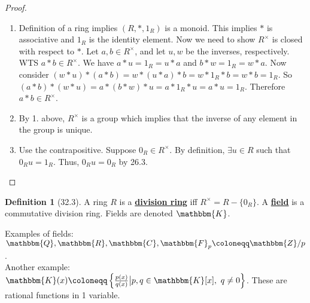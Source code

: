 \documentclass{article}
\newcommand{\Z}{\mathbbm{Z}}
\newcommand{\Q}{\mathbbm{Q}}
\newcommand{\R}{\mathbbm{R}}
\newcommand{\C}{\mathbbm{C}}
\newcommand{\coleq}{\coloneqq}
\newcommand{\define}[1]{\textbf{\underline{#1}}}
\theoremstyle{definition}
\newtheorem*{defn}{Definition}
\theoremstyle{remark}
\newcommand{\K}{\mathbbm{K}}
\begin{document}
{{            \begin{proof}
                \begin{enumerate}
                    \item Definition of a ring implies $(R,*,1_R)$ is a monoid. This implies $*$ is associative and $1_R$ is the identity element. Now we need to show $R^\times$ is closed with respect to $*$. Let $a,b\in R^\times$, and let $u,w$ be the inverses, respectively. WTS $a*b \in R^\times$. We have $a*u=1_R=u*a$ and $b*w=1_R=w*a$. Now consider $(w*u)*(a*b)=w*(u*a)*b=w*1_R*b=w*b=1_R$. So $(a*b)*(w*u)=a*(b*w)*u=a*1_R*u=a*u=1_R$. Therefore $a*b \in R^\times$.
                    \item By 1. above, $R^\times$ is a group which implies that the inverse of any element in the group is unique.
                    \item Use the contrapositive. Suppose $0_R \in R^\times$. By definition, $\exists u \in R$ such that $0_Ru=1_R$. Thus, $0_Ru=0_R$ by 26.3.
                \end{enumerate}
            \end{proof}
            
            \begin{defn}[32.3]
                A ring $R$ is a \define{division ring} iff $R^\times=R-\{0_R\}$. A \define{field} is a commutative division ring. Fields are denoted $\K$.
            \end{defn}
            
            Examples of fields: $\Q,\R,\C,\mathbbm{F}_p\coleq\Z/p$.\\
            
            Another example: $\K(x)\coleq\left\{\frac{p(x)}{q(x)}\big|p,q \in \K[x], \ q\neq 0\right\}$. These are rational functions in 1 variable.
        }
    }
    
\end{document}
